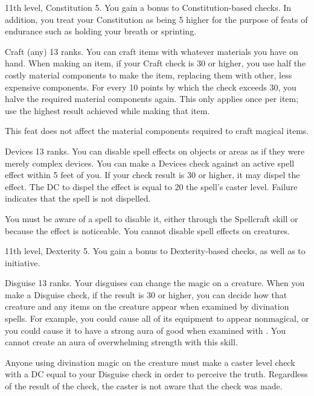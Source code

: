 \featpre 11th level, Constitution 5.
\featben You gain a  bonus to Constitution-based checks. In addition, you treat your Constitution as being 5 higher for the purpose of feats of endurance such as holding your breath or sprinting.

\featpre Craft (any) 13 ranks.
\featben You can craft items with whatever materials you have on hand. When making an item, if your Craft check is 30 or higher, you use half the costly material components to make the item, replacing them with other, less expensive components. For every 10 points by which the check exceeds 30, you halve the required material components again. This only applies once per item; use the highest result achieved while making that item.

This feat does not affect the material components required to craft magical items.

\featpre Devices 13 ranks.
\featben You can disable spell effects on objects or areas as if they were merely complex devices. You can make a Devices check against an active spell effect within 5 feet of you. If your check result is 30 or higher, it may dispel the effect. The DC to dispel the effect is equal to 20 \add the spell's caster level. Failure indicates that the spell is not dispelled.

You must be aware of a spell to disable it, either through the Spellcraft skill or because the effect is noticeable. You cannot disable spell effects on creatures.

\featpre 11th level, Dexterity 5.
\featben You gain a  bonus to Dexterity-based checks, as well as to initiative.

\featpre Disguise 13 ranks.
\featben Your disguises can change the magic on a creature. When you make a Disguise check, if the result is 30 or higher, you can decide how that creature and any items on the creature appear when examined by divination spells. For example, you could cause all of its equipment to appear nonmagical, or you could cause it to have a strong aura of good when examined with . You cannot create an aura of overwhelming strength with this skill.

Anyone using divination magic on the creature must make a caster level check with a DC equal to your Disguise check in order to perceive the truth. Regardless of the result of the check, the caster is not aware that the check was made.

